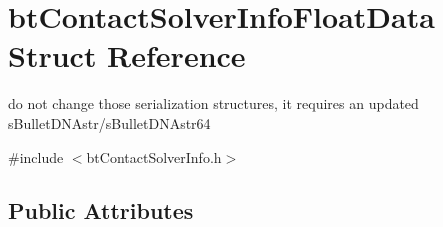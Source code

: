 \hypertarget{structbt_contact_solver_info_float_data}{\section{bt\+Contact\+Solver\+Info\+Float\+Data Struct Reference}
\label{structbt_contact_solver_info_float_data}
}


do not change those serialization structures, it requires an updated s\+Bullet\+D\+N\+Astr/s\+Bullet\+D\+N\+Astr64  




{\ttfamily \#include $<$bt\+Contact\+Solver\+Info.\+h$>$}

\subsection*{Public Attributes}
